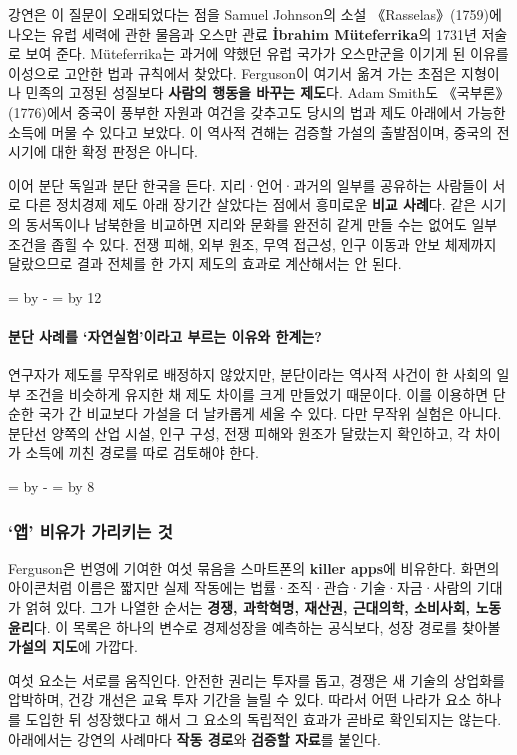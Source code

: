\documentclass[10pt,a4paper]{article}
\newcommand{\ReserveQuestionSpace}{%
  \par\begingroup
  \dimen0=\pagegoal \advance\dimen0 by -\pagetotal
  \dimen2=\baselineskip \multiply\dimen2 by 12
  \ifdim\dimen0<\dimen2 \newpage\fi
  \endgroup}
\newcommand{\ReserveReadingSectionSpace}{%
  \par\begingroup
  \dimen0=\pagegoal \advance\dimen0 by -\pagetotal
  \dimen2=\baselineskip \multiply\dimen2 by 8
  \ifdim\dimen0<\dimen2 \newpage\fi
  \endgroup}
\begin{document}
강연은 이 질문이 오래되었다는 점을 Samuel Johnson의 소설 《Rasselas》(1759)에 나오는 유럽 세력에 관한 물음과 오스만 관료 \textbf{İbrahim Müteferrika}의 1731년 저술로 보여 준다. Müteferrika는 과거에 약했던 유럽 국가가 오스만군을 이기게 된 이유를 이성으로 고안한 법과 규칙에서 찾았다. Ferguson이 여기서 옮겨 가는 초점은 지형이나 민족의 고정된 성질보다 \textbf{사람의 행동을 바꾸는 제도}다. Adam Smith도 《국부론》(1776)에서 중국이 풍부한 자원과 여건을 갖추고도 당시의 법과 제도 아래에서 가능한 소득에 머물 수 있다고 보았다. 이 역사적 견해는 검증할 가설의 출발점이며, 중국의 전 시기에 대한 확정 판정은 아니다.\par

이어 분단 독일과 분단 한국을 든다. 지리·언어·과거의 일부를 공유하는 사람들이 서로 다른 정치경제 제도 아래 장기간 살았다는 점에서 흥미로운 \textbf{비교 사례}다. 같은 시기의 동서독이나 남북한을 비교하면 지리와 문화를 완전히 같게 만들 수는 없어도 일부 조건을 좁힐 수 있다. 전쟁 피해, 외부 원조, 무역 접근성, 인구 이동과 안보 체제까지 달랐으므로 결과 전체를 한 가지 제도의 효과로 계산해서는 안 된다.\par

\ReserveQuestionSpace
\paragraph{분단 사례를 ‘자연실험’이라고 부르는 이유와 한계는?}
연구자가 제도를 무작위로 배정하지 않았지만, 분단이라는 역사적 사건이 한 사회의 일부 조건을 비슷하게 유지한 채 제도 차이를 크게 만들었기 때문이다. 이를 이용하면 단순한 국가 간 비교보다 가설을 더 날카롭게 세울 수 있다. 다만 무작위 실험은 아니다. 분단선 양쪽의 산업 시설, 인구 구성, 전쟁 피해와 원조가 달랐는지 확인하고, 각 차이가 소득에 끼친 경로를 따로 검토해야 한다.\par

\ReserveReadingSectionSpace
\subsubsection*{‘앱’ 비유가 가리키는 것}

Ferguson은 번영에 기여한 여섯 묶음을 스마트폰의 \textbf{killer apps}에 비유한다. 화면의 아이콘처럼 이름은 짧지만 실제 작동에는 법률·조직·관습·기술·자금·사람의 기대가 얽혀 있다. 그가 나열한 순서는 \textbf{경쟁, 과학혁명, 재산권, 근대의학, 소비사회, 노동윤리}다. 이 목록은 하나의 변수로 경제성장을 예측하는 공식보다, 성장 경로를 찾아볼 \textbf{가설의 지도}에 가깝다.\par

여섯 요소는 서로를 움직인다. 안전한 권리는 투자를 돕고, 경쟁은 새 기술의 상업화를 압박하며, 건강 개선은 교육 투자 기간을 늘릴 수 있다. 따라서 어떤 나라가 요소 하나를 도입한 뒤 성장했다고 해서 그 요소의 독립적인 효과가 곧바로 확인되지는 않는다. 아래에서는 강연의 사례마다 \textbf{작동 경로}와 \textbf{검증할 자료}를 붙인다.\par
\end{document}
